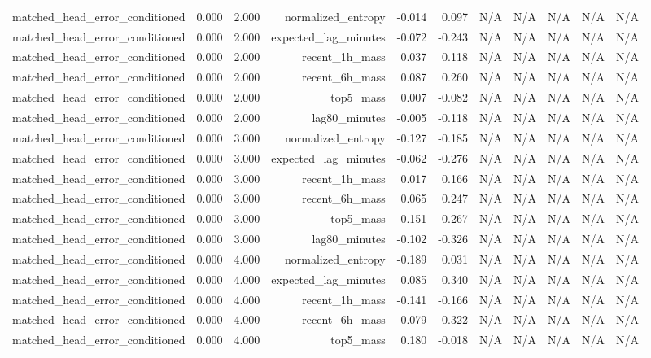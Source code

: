\begin{table}[h!]
\begin{tabular}{lrrrrrrrrrr}
matched\_head\_error\_conditioned & 0.000 & 2.000 & normalized\_entropy & -0.014 & 0.097 & N/A & N/A & N/A & N/A & N/A \\
matched\_head\_error\_conditioned & 0.000 & 2.000 & expected\_lag\_minutes & -0.072 & -0.243 & N/A & N/A & N/A & N/A & N/A \\
matched\_head\_error\_conditioned & 0.000 & 2.000 & recent\_1h\_mass & 0.037 & 0.118 & N/A & N/A & N/A & N/A & N/A \\
matched\_head\_error\_conditioned & 0.000 & 2.000 & recent\_6h\_mass & 0.087 & 0.260 & N/A & N/A & N/A & N/A & N/A \\
matched\_head\_error\_conditioned & 0.000 & 2.000 & top5\_mass & 0.007 & -0.082 & N/A & N/A & N/A & N/A & N/A \\
matched\_head\_error\_conditioned & 0.000 & 2.000 & lag80\_minutes & -0.005 & -0.118 & N/A & N/A & N/A & N/A & N/A \\
matched\_head\_error\_conditioned & 0.000 & 3.000 & normalized\_entropy & -0.127 & -0.185 & N/A & N/A & N/A & N/A & N/A \\
matched\_head\_error\_conditioned & 0.000 & 3.000 & expected\_lag\_minutes & -0.062 & -0.276 & N/A & N/A & N/A & N/A & N/A \\
matched\_head\_error\_conditioned & 0.000 & 3.000 & recent\_1h\_mass & 0.017 & 0.166 & N/A & N/A & N/A & N/A & N/A \\
matched\_head\_error\_conditioned & 0.000 & 3.000 & recent\_6h\_mass & 0.065 & 0.247 & N/A & N/A & N/A & N/A & N/A \\
matched\_head\_error\_conditioned & 0.000 & 3.000 & top5\_mass & 0.151 & 0.267 & N/A & N/A & N/A & N/A & N/A \\
matched\_head\_error\_conditioned & 0.000 & 3.000 & lag80\_minutes & -0.102 & -0.326 & N/A & N/A & N/A & N/A & N/A \\
matched\_head\_error\_conditioned & 0.000 & 4.000 & normalized\_entropy & -0.189 & 0.031 & N/A & N/A & N/A & N/A & N/A \\
matched\_head\_error\_conditioned & 0.000 & 4.000 & expected\_lag\_minutes & 0.085 & 0.340 & N/A & N/A & N/A & N/A & N/A \\
matched\_head\_error\_conditioned & 0.000 & 4.000 & recent\_1h\_mass & -0.141 & -0.166 & N/A & N/A & N/A & N/A & N/A \\
matched\_head\_error\_conditioned & 0.000 & 4.000 & recent\_6h\_mass & -0.079 & -0.322 & N/A & N/A & N/A & N/A & N/A \\
matched\_head\_error\_conditioned & 0.000 & 4.000 & top5\_mass & 0.180 & -0.018 & N/A & N/A & N/A & N/A & N/A \\

\end{tabular}
\end{table}
